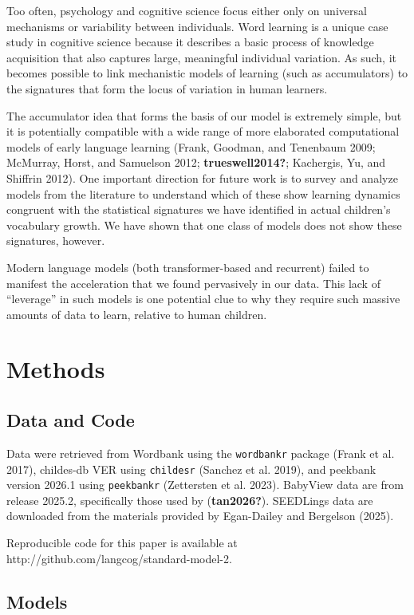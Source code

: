 \documentclass[
  11pt,
]{article}
\begin{document}
Too often, psychology and cognitive science focus either only on
universal mechanisms or variability between individuals. Word learning
is a unique case study in cognitive science because it describes a basic
process of knowledge acquisition that also captures large, meaningful
individual variation. As such, it becomes possible to link mechanistic
models of learning (such as accumulators) to the signatures that form
the locus of variation in human learners.

The accumulator idea that forms the basis of our model is extremely
simple, but it is potentially compatible with a wide range of more
elaborated computational models of early language learning (Frank,
Goodman, and Tenenbaum 2009; McMurray, Horst, and Samuelson 2012;
\textbf{trueswell2014?}; Kachergis, Yu, and Shiffrin 2012). One
important direction for future work is to survey and analyze models from
the literature to understand which of these show learning dynamics
congruent with the statistical signatures we have identified in actual
children's vocabulary growth. We have shown that one class of models
does not show these signatures, however.

Modern language models (both transformer-based and recurrent) failed to
manifest the acceleration that we found pervasively in our data. This
lack of ``leverage'' in such models is one potential clue to why they
require such massive amounts of data to learn, relative to human
children.

\section{Methods}\label{methods}

\subsection{Data and Code}\label{data-and-code}

Data were retrieved from Wordbank using the \texttt{wordbankr} package
(Frank et al. 2017), childes-db VER using \texttt{childesr} (Sanchez et
al. 2019), and peekbank version 2026.1 using \texttt{peekbankr}
(Zettersten et al. 2023). BabyView data are from release 2025.2,
specifically those used by (\textbf{tan2026?}). SEEDLings data are
downloaded from the materials provided by Egan-Dailey and Bergelson
(2025).

Reproducible code for this paper is available at
http://github.com/langcog/standard-model-2.

\subsection{Models}\label{models}
\end{document}

